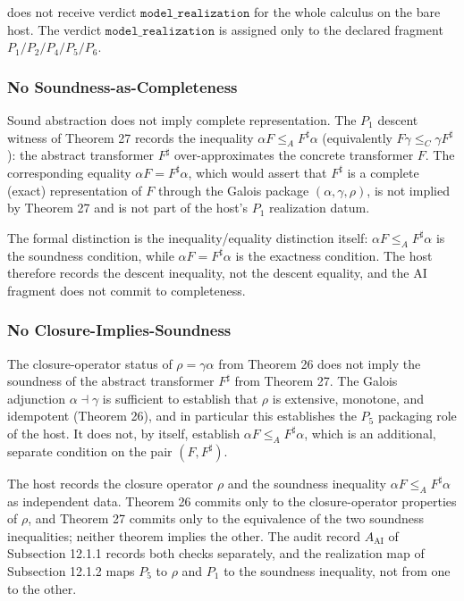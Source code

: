 \documentclass[11pt]{article}
\theoremstyle{definition}
\begin{document}
does not receive verdict \(\texttt{model\_realization}\) for the whole calculus on the bare host. The verdict \(\texttt{model\_realization}\) is assigned only to the declared fragment \(P_1/P_2/P_4/P_5/P_6\).

\subsubsection{No Soundness-as-Completeness}

Sound abstraction does not imply complete representation. The \(P_1\) descent witness of Theorem 27 records the inequality \(\alpha F\le_A F^{\sharp}\alpha\) (equivalently \(F\gamma\le_C\gamma F^{\sharp}\)): the abstract transformer \(F^{\sharp}\) over-approximates the concrete transformer \(F\). The corresponding equality \(\alpha F=F^{\sharp}\alpha\), which would assert that \(F^{\sharp}\) is a complete (exact) representation of \(F\) through the Galois package \((\alpha,\gamma,\rho)\), is not implied by Theorem 27 and is not part of the host's \(P_1\) realization datum.

The formal distinction is the inequality/equality distinction itself: \(\alpha F\le_A F^{\sharp}\alpha\) is the soundness condition, while \(\alpha F=F^{\sharp}\alpha\) is the exactness condition. The host therefore records the descent inequality, not the descent equality, and the AI fragment does not commit to completeness.

\subsubsection{No Closure-Implies-Soundness}

The closure-operator status of \(\rho=\gamma\alpha\) from Theorem 26 does not imply the soundness of the abstract transformer \(F^{\sharp}\) from Theorem 27. The Galois adjunction \(\alpha\dashv\gamma\) is sufficient to establish that \(\rho\) is extensive, monotone, and idempotent (Theorem 26), and in particular this establishes the \(P_5\) packaging role of the host. It does not, by itself, establish \(\alpha F\le_A F^{\sharp}\alpha\), which is an additional, separate condition on the pair \((F,F^{\sharp})\).

The host records the closure operator \(\rho\) and the soundness inequality \(\alpha F\le_A F^{\sharp}\alpha\) as independent data. Theorem 26 commits only to the closure-operator properties of \(\rho\), and Theorem 27 commits only to the equivalence of the two soundness inequalities; neither theorem implies the other. The audit record \(A_{\mathrm{AI}}\) of Subsection 12.1.1 records both checks separately, and the realization map of Subsection 12.1.2 maps \(P_5\) to \(\rho\) and \(P_1\) to the soundness inequality, not from one to the other.
\end{document}
